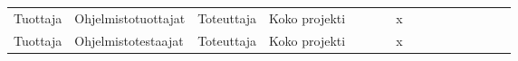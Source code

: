 \begin{landscape}
\begin{table}[]
{\begin{tabular}{llllllllllllllll}
Tuottaja                                                                                                                                           & Ohjelmistotuottajat                                                                                                 & Toteuttaja                                                                                                       & Koko projekti                                                                                  &                                                                                    &                                  &                                   & x                                      &                                                                                         &                                      &                                                       &                                      &                                                                                                    &                                     &                                   &                                 \\
Tuottaja                                                                                                                                           & Ohjelmistotestaajat                                                                                                 & Toteuttaja                                                                                                       & Koko projekti                                                                                  &                                                                                    &                                  &                                   & x                                      &                                                                                         &                                      &                                                       &                                      &                                                                                                    &                                     &                                   &                                 \\

\end{tabular}}
\end{table}
\end{landscape}
